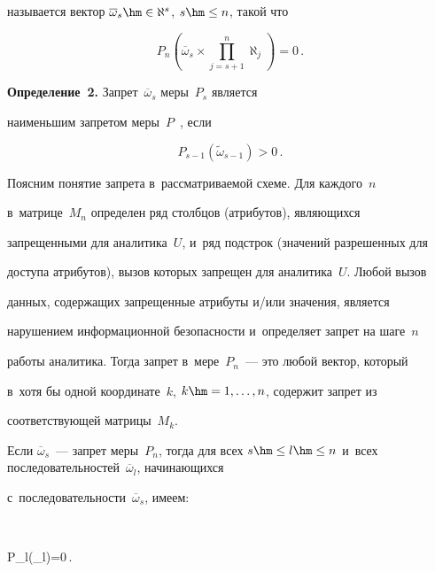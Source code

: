 называется вектор $\overline{\omega}_s\hm\in \aleph^s$, $s\hm\leq n$, такой что


  $$


  P_n\left(\overline{\omega}_s\times \prod\limits^n_{j=s+1} \aleph_j\right)=0\,.


  $$


  


  \noindent


  \textbf{Определение~2.} Запрет~$\overline{\omega}_s$ меры~$P_s$ является 


наименьшим запретом меры~$P$~\cite{4-mar, 5-mar}, если


  $$


  P_{s-1}\left( \tilde{\omega}_{s-1}\right)>0\,.


  $$


    


    \smallskip


    


    Поясним понятие запрета в~рассматриваемой схеме. Для каждого~$n$ 


в~мат\-ри\-це~$M_n$ определен ряд столбцов (атрибутов), являющихся 


запрещенными для аналитика~$U$, и~ряд подстрок (значений разрешенных для 


доступа атрибутов), вызов которых запрещен для аналитика~$U$. Любой вызов 


данных, содержащих запрещенные атрибуты и\!/\!или значения, является 


нарушением информационной безопасности и~определяет запрет на шаге~$n$ 


работы аналитика. Тогда запрет в~мере~$P_n$~--- это любой вектор, который 


в~хотя бы одной координате~$k$, $k\hm =1,\ldots , n$, содержит запрет из 


соответствующей матрицы~$M_k$.


  


  Если $\overline{\omega}_s$~--- запрет меры~$P_n$, тогда для всех $s\hm\leq 


l\hm\leq n$ и~всех последовательностей~$\overline{\omega}_l$, начинающихся 


с~последовательности~$\overline{\omega}_s$, имеем:


  $$


  P_l\left(\overline{\omega}_l\right)=0\,.


